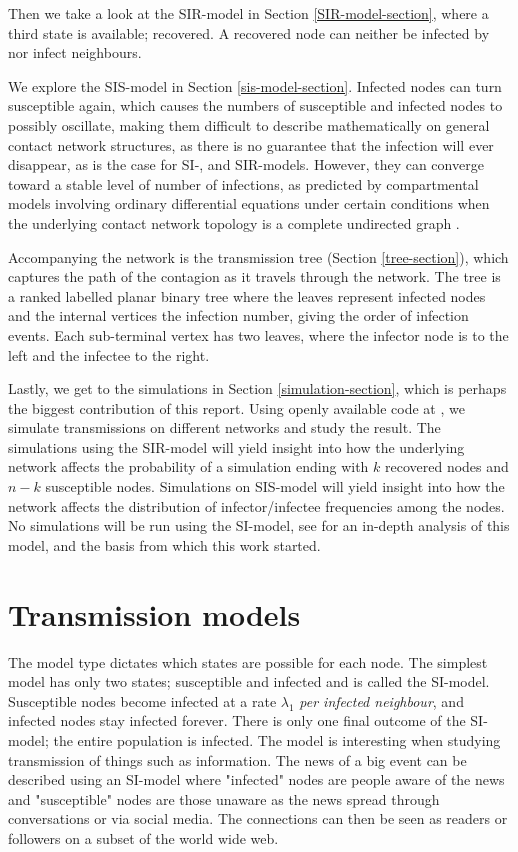 \documentclass[12pt]{article} %
\numberwithin{equation}{section}
\begin{document}
Then we take a look at the SIR-model in Section \ref{SIR-model-section}, where a third state is available; recovered. A recovered node can neither be infected by nor infect neighbours.

We explore the SIS-model in Section \ref{sis-model-section}. Infected nodes can turn susceptible again, which causes the numbers of susceptible and infected nodes to possibly oscillate, making them difficult to describe mathematically on general contact network structures, as there is no guarantee that the infection will ever disappear, as is the case for SI-, and SIR-models. However, they can converge toward a stable level of number of infections, as predicted by compartmental models involving ordinary differential equations under certain conditions when the underlying contact network topology is a complete undirected graph \cite{hethcote1989three}.

Accompanying the network is the transmission tree (Section \ref{tree-section}), which captures the path of the contagion as it travels through the network. The tree is a ranked labelled planar binary tree where the leaves represent infected nodes and the internal vertices the infection number, giving the order of infection events. Each sub-terminal vertex has two leaves, where the infector node is to the left and the infectee to the right. 

Lastly, we get to the simulations in Section \ref{simulation-section}, which is perhaps the biggest contribution of this report. Using openly available code at \cite{github}, we simulate transmissions on different networks and study the result. The simulations using the SIR-model will yield insight into how the underlying network affects the probability of a simulation ending with $k$ recovered nodes and $n-k$ susceptible nodes. Simulations on SIS-model will yield insight into how the network affects the distribution of infector/infectee frequencies among the nodes. No simulations will be run using the SI-model, see \cite{sainudiin2016transmission} for an in-depth analysis of this model, and the basis from which this work started.

\section{Transmission models}\label{section1}

The model type dictates which states are possible for each node. The simplest model has only two states; susceptible and infected and is called the SI-model. Susceptible nodes become infected at a rate $\lambda_1$ \textit{per infected neighbour}, and infected nodes stay infected forever. There is only one final outcome of the SI-model; the entire population is infected. The model is interesting when studying transmission of things such as information. The news of a big event can be described using an SI-model where "infected" nodes are people aware of the news and "susceptible" nodes are those unaware as the news spread through conversations or via social media. The connections can then be seen as readers or followers on a subset of the world wide web.
\end{document}
